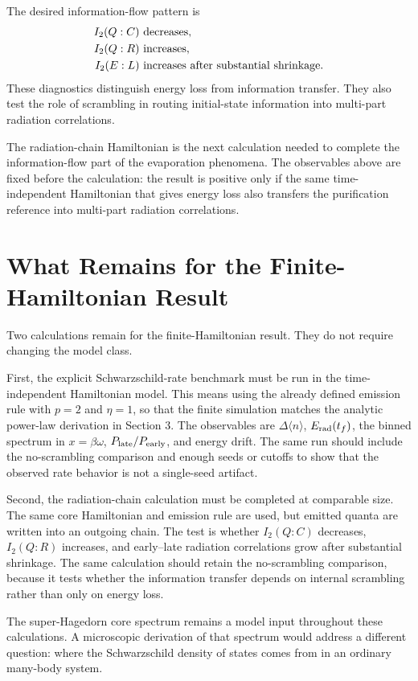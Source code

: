 \documentclass[12pt]{article}
\begin{document}
The desired information-flow pattern is
\begin{align}
    I_2(Q:C)&\ \hbox{decreases},\\
    I_2(Q:R)&\ \hbox{increases},\\
    I_2(E:L)&\ \hbox{increases after substantial shrinkage}.
\end{align}
These diagnostics distinguish energy loss from information transfer.  They
also test the role of scrambling in routing initial-state information into
multi-part radiation correlations.

The radiation-chain Hamiltonian is the next calculation needed to complete
the information-flow part of the evaporation phenomena.  The observables above
are fixed before the calculation: the result is positive only if the same
time-independent Hamiltonian that gives energy loss also transfers the purification
reference into multi-part radiation correlations.

\section{What Remains for the Finite-Hamiltonian Result}

Two calculations remain for the finite-Hamiltonian result.  They do not require
changing the model class.

First, the explicit Schwarzschild-rate benchmark must be run in the
time-independent Hamiltonian model.  This means using the already defined
emission rule with $p=2$ and $\eta=1$, so that the finite simulation matches
the analytic power-law derivation in Section 3.  The observables are
$\Delta\langle n\rangle$, $E_{\rm rad}(t_f)$, the binned spectrum in
$x=\beta\omega$, $P_{\rm late}/P_{\rm early}$, and energy drift.  The same run
should include the no-scrambling comparison and enough seeds or cutoffs to show
that the observed rate behavior is not a single-seed artifact.

Second, the radiation-chain calculation must be completed at comparable size.
The same core Hamiltonian and emission rule are used, but emitted quanta are
written into an outgoing chain.  The test is whether $I_2(Q:C)$ decreases,
$I_2(Q:R)$ increases, and early--late radiation correlations grow after
substantial shrinkage.  The same calculation should retain the no-scrambling
comparison, because it tests whether the information transfer depends on
internal scrambling rather than only on energy loss.

The super-Hagedorn core spectrum remains a model input throughout these
calculations.  A microscopic derivation of that spectrum would address a
different question: where the Schwarzschild density of states comes from in an
ordinary many-body system.
\end{document}
